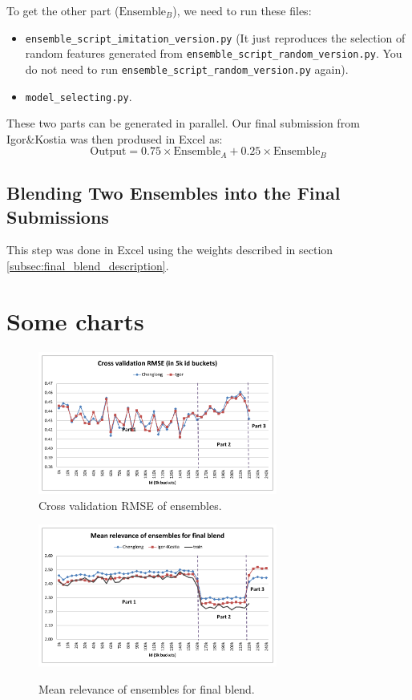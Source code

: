\documentclass[12pt]{article}
\begin{document}
{{\begin{appendices}
To get the other part ($\text{Ensemble}_B$), we need to run these files:
\begin{itemize}
\item \texttt{ensemble\_script\_imitation\_version.py} (It just reproduces the selection of random features generated from \texttt{ensemble\_script\_random\_version.py}. You do not need to run \texttt{ensemble\_script\_random\_version.py} again).
\item \texttt{model\_selecting.py}.
\end{itemize}

These two parts can be generated in parallel. Our final submission from Igor\&Kostia was then prodused in Excel as:
$$\text{Output}=0.75\times \text{Ensemble}_A+ 0.25\times \text{Ensemble}_B$$


\subsection{Blending Two Ensembles into the Final Submissions}
This step was done in Excel using the weights described in section \ref{subsec:final_blend_description}.


\newpage
\section{Some charts}
\begin{figure}[h]
  \centering
\includegraphics[width=0.7\textwidth]{../Fig/plot_ensembles_performance.pdf}\\
  \caption{Cross validation RMSE of ensembles.}
  \label{Fig:ensembles_performance}
  \includegraphics[width=0.7\textwidth]{../Fig/plot_ensembles_means.pdf}\\
  \caption{Mean relevance of ensembles for final blend.}
  \label{Fig:ensembles_means}
\end{figure}


\end{appendices}}}
\end{document}
